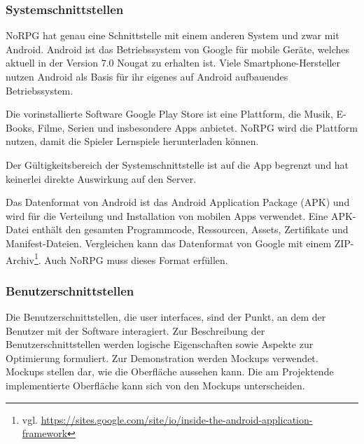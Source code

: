 		\subsubsection{Systemschnittstellen}
			NoRPG hat genau eine Schnittstelle mit einem anderen System und zwar mit Android. Android ist das Betriebssystem von Google für mobile Geräte, welches aktuell in der Version 7.0 Nougat zu erhalten ist. Viele Smartphone-Hersteller nutzen Android als Basis für ihr eigenes auf Android aufbauendes Betriebssystem. 
			
			Die vorinstallierte Software Google Play Store ist eine Plattform, die Musik, E-Books, Filme, Serien und insbesondere Apps anbietet. NoRPG wird die Plattform nutzen, damit die Spieler Lernspiele herunterladen können.
			
			Der Gültigkeitsbereich der Systemschnittstelle ist auf die App begrenzt und hat keinerlei direkte Auswirkung auf den Server. 
			
			Das Datenformat von Android ist das Android Application Package (APK) und wird für die Verteilung und Installation von mobilen Apps verwendet. Eine APK-Datei enthält den gesamten Programmcode, Ressourcen, Assets, Zertifikate und Manifest-Dateien. Vergleichen kann das Datenformat von Google mit einem ZIP-Archiv\footnote{vgl. \url{https://sites.google.com/site/io/inside-the-android-application-framework}}. Auch NoRPG muss dieses Format erfüllen.
			
		\subsubsection{Benutzerschnittstellen}
			Die Benutzerschnittstellen, die user interfaces, sind der Punkt, an dem der Benutzer mit der Software interagiert. Zur Beschreibung der Benutzerschnittstellen werden logische Eigenschaften sowie Aspekte zur Optimierung formuliert. Zur Demonstration werden Mockups verwendet. Mockups stellen dar, wie die Oberfläche aussehen kann. Die am Projektende implementierte Oberfläche kann sich von den Mockups unterscheiden.
			
